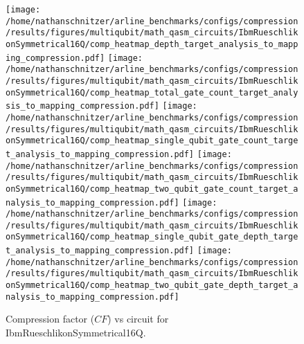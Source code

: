 \documentclass{report}%
\begin{document}
\begin{figure}[h!]%
\centering%
\texttt{[image: /home/nathanschnitzer/arline\_benchmarks/configs/compression/results/figures/multiqubit/math\_qasm\_circuits/IbmRueschlikonSymmetrical16Q/comp\_heatmap\_depth\_target\_analysis\_to\_mapping\_compression.pdf]}%
\centering%
\texttt{[image: /home/nathanschnitzer/arline\_benchmarks/configs/compression/results/figures/multiqubit/math\_qasm\_circuits/IbmRueschlikonSymmetrical16Q/comp\_heatmap\_total\_gate\_count\_target\_analysis\_to\_mapping\_compression.pdf]}%
\linebreak%
\centering%
\texttt{[image: /home/nathanschnitzer/arline\_benchmarks/configs/compression/results/figures/multiqubit/math\_qasm\_circuits/IbmRueschlikonSymmetrical16Q/comp\_heatmap\_single\_qubit\_gate\_count\_target\_analysis\_to\_mapping\_compression.pdf]}%
\centering%
\texttt{[image: /home/nathanschnitzer/arline\_benchmarks/configs/compression/results/figures/multiqubit/math\_qasm\_circuits/IbmRueschlikonSymmetrical16Q/comp\_heatmap\_two\_qubit\_gate\_count\_target\_analysis\_to\_mapping\_compression.pdf]}%
\linebreak%
\centering%
\texttt{[image: /home/nathanschnitzer/arline\_benchmarks/configs/compression/results/figures/multiqubit/math\_qasm\_circuits/IbmRueschlikonSymmetrical16Q/comp\_heatmap\_single\_qubit\_gate\_depth\_target\_analysis\_to\_mapping\_compression.pdf]}%
\centering%
\texttt{[image: /home/nathanschnitzer/arline\_benchmarks/configs/compression/results/figures/multiqubit/math\_qasm\_circuits/IbmRueschlikonSymmetrical16Q/comp\_heatmap\_two\_qubit\_gate\_depth\_target\_analysis\_to\_mapping\_compression.pdf]}%
\linebreak%
\caption{Compression factor ($CF$) vs circuit for IbmRueschlikonSymmetrical16Q.}%
\end{figure}
\end{document}
